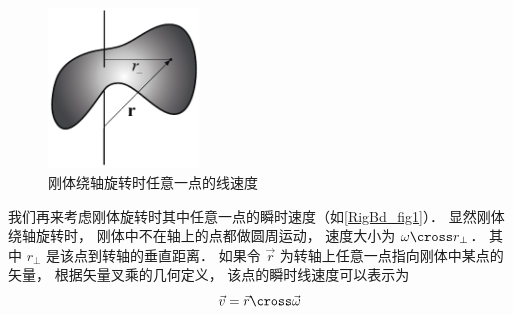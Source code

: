 \begin{figure}[ht]
\centering
\includegraphics[width=4cm]{./figures/RigBd.pdf}
\caption{刚体绕轴旋转时任意一点的线速度} \label{RigBd_fig1}
\end{figure}

我们再来考虑刚体旋转时其中任意一点的瞬时速度（如\autoref{RigBd_fig1}）． 显然刚体绕轴旋转时， 刚体中不在轴上的点都做圆周运动， 速度大小为 $\omega \cross r_{\bot}$． 其中 $r_{\bot}$ 是该点到转轴的垂直距离． 如果令 $\vec r$ 为转轴上任意一点指向刚体中某点的矢量， 根据矢量叉乘的几何定义， 该点的瞬时线速度可以表示为
\begin{equation}
\vec v = \vec r \cross \vec \omega
\end{equation}
